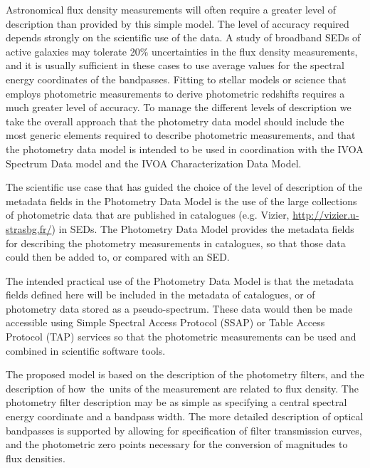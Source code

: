 \documentclass[11pt,a4paper]{ivoa}
\begin{document}
Astronomical flux density measurements will often require a greater level of description than provided by this simple model. The level of accuracy required depends strongly on the scientific use of the data. A study of broadband SEDs of active galaxies may tolerate 20$\%$  uncertainties in the flux density measurements, and it is usually sufficient in these cases to use average values for the spectral energy coordinates of the bandpasses. Fitting to stellar models or science that employs photometric measurements to derive photometric redshifts requires a much greater level of accuracy. To manage the different levels of description we take the overall approach that the photometry data model should include the most generic elements required to describe photometric measurements, and that the photometry data model is intended to be used in coordination with the IVOA Spectrum Data model and the IVOA Characterization Data Model.
\par

The scientific use case that has guided the choice of the level of description of the metadata fields in the Photometry Data Model is the use of the large collections of photometric data that are published in catalogues (e.g. Vizier, \url{http://vizier.u-strasbg.fr/}) in SEDs. The Photometry Data Model provides the metadata fields for describing the photometry measurements in catalogues, so that those data could then be added to, or compared with an SED.
\par

The intended practical use of the Photometry Data Model is that the metadata fields defined here will be included in the metadata of catalogues, or of photometry data stored as a pseudo-spectrum. These data would then be made accessible using Simple Spectral Access Protocol (SSAP) or Table Access Protocol (TAP) services so that the photometric measurements can be used and combined in scientific software tools.

\par
The proposed model is based on the description of the photometry filters, and the description of how\ the\ units of the measurement are related to flux density. The photometry filter description may be as simple as specifying a central spectral energy coordinate and a bandpass width. The more detailed description of optical bandpasses is supported by allowing for specification of filter transmission curves, and the   photometric zero points necessary for the conversion of magnitudes to flux densities.
\par
\end{document}
